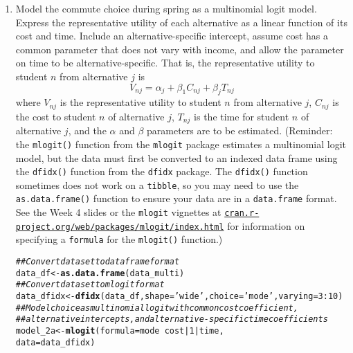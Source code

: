 \documentclass[11pt,letterpaper]{article}\usepackage[]{graphicx}\usepackage[]{xcolor}
\makeatletter
\newcommand{\hlnum}[1]{\textcolor[rgb]{0.686,0.059,0.569}{#1}}%
\newcommand{\hlstr}[1]{\textcolor[rgb]{0.192,0.494,0.8}{#1}}%
\newcommand{\hlcom}[1]{\textcolor[rgb]{0.678,0.584,0.686}{\textit{#1}}}%
\newcommand{\hlopt}[1]{\textcolor[rgb]{0,0,0}{#1}}%
\newcommand{\hlstd}[1]{\textcolor[rgb]{0.345,0.345,0.345}{#1}}%
\newcommand{\hlkwb}[1]{\textcolor[rgb]{0.69,0.353,0.396}{#1}}%
\newcommand{\hlkwc}[1]{\textcolor[rgb]{0.333,0.667,0.333}{#1}}%
\newcommand{\hlkwd}[1]{\textcolor[rgb]{0.737,0.353,0.396}{\textbf{#1}}}%
\newenvironment{kframe}{%
 \def\at@end@of@kframe{}%
 \ifinner\ifhmode%
  \def\at@end@of@kframe{\end{minipage}}%
  \begin{minipage}{\columnwidth}%
 \fi\fi%
 \def\FrameCommand##1{\hskip\@totalleftmargin \hskip-\fboxsep
 \colorbox{shadecolor}{##1}\hskip-\fboxsep
     \hskip-\linewidth \hskip-\@totalleftmargin \hskip\columnwidth}%
 \MakeFramed {\advance\hsize-\width
   \@totalleftmargin\z@ \linewidth\hsize
   \@setminipage}}%
 {\par\unskip\endMakeFramed%
 \at@end@of@kframe}
\newenvironment{knitrout}{}{} %
\makeatother
\begin{document}
\begin{enumerate}[label=\alph*., leftmargin=*]
	\item Model the commute choice during spring as a multinomial logit model. Express the representative utility of each alternative as a linear function of its cost and time. Include an alternative-specific intercept, assume cost has a common parameter that does not vary with income, and allow the parameter on time to be alternative-specific. That is, the representative utility to student $n$ from alternative $j$ is
	$$V_{nj} = \alpha_j + \beta_1 C_{nj} + \beta_j T_{nj}$$
	where $V_{nj}$ is the representative utility to student $n$ from alternative $j$, $C_{nj}$ is the cost to student $n$ of alternative $j$, $T_{nj}$ is the time for student $n$ of alternative $j$, and the $\alpha$ and $\beta$ parameters are to be estimated. (Reminder: the \texttt{mlogit()} function from the \texttt{mlogit} package estimates a multinomial logit model, but the data must first be converted to an indexed data frame using the \texttt{dfidx()} function from the \texttt{dfidx} package. The \texttt{dfidx()} function sometimes does not work on a \texttt{tibble}, so you may need to use the \texttt{as.data.frame()} function to ensure your data are in a \texttt{data.frame} format. See the Week 4 slides or the \texttt{mlogit} vignettes at \href{https://cran.r-project.org/web/packages/mlogit/index.html}{\texttt{cran.r-project.org/web/packages/mlogit/index.html}} for information on specifying a \texttt{formula} for the \texttt{mlogit()} function.)

\begin{knitrout}
\color{fgcolor}\begin{kframe}
\begin{alltt}
\hlcom{## Convert dataset to data frame format}
\hlstd{data_df} \hlkwb{<-} \hlkwd{as.data.frame}\hlstd{(data_multi)}
\hlcom{## Convert dataset to mlogit format}
\hlstd{data_dfidx} \hlkwb{<-} \hlkwd{dfidx}\hlstd{(data_df,} \hlkwc{shape} \hlstd{=} \hlstr{'wide'}\hlstd{,} \hlkwc{choice} \hlstd{=} \hlstr{'mode'}\hlstd{,} \hlkwc{varying} \hlstd{=} \hlnum{3}\hlopt{:}\hlnum{10}\hlstd{)}
\hlcom{## Model choice as multinomial logit with common cost coefficient, }
\hlcom{## alternative intercepts, and alternative-specific time coefficients}
\hlstd{model_2a} \hlkwb{<-} \hlkwd{mlogit}\hlstd{(}\hlkwc{formula} \hlstd{= mode} \hlopt{~} \hlstd{cost} \hlopt{|} \hlnum{1} \hlopt{|} \hlstd{time,}
                   \hlkwc{data} \hlstd{= data_dfidx)}
\end{alltt}
\end{kframe}
\end{knitrout}


\end{enumerate}
\end{document}
